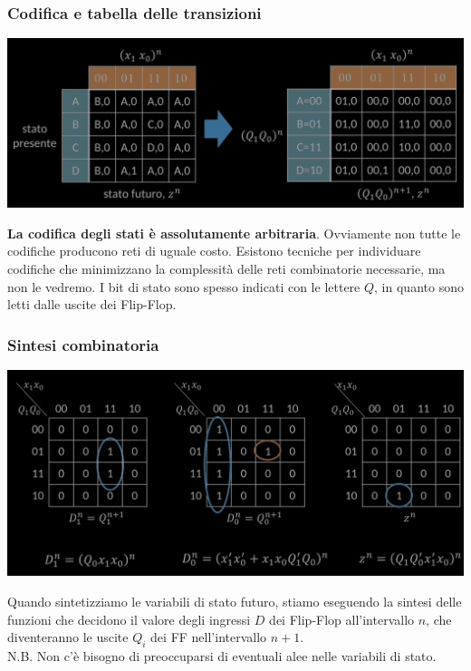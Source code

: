 \documentclass{article}
\begin{document}
\subsubsection*{Codifica e tabella delle transizioni}
\begin{center}
    \includegraphics[scale=0.37]{codifica-cassaforte-rss.png}
\end{center}
\textbf{La codifica degli stati è assolutamente arbitraria}. Ovviamente non tutte le codifiche producono reti di uguale costo. Esistono tecniche per individuare codifiche che minimizzano la complessità delle reti combinatorie necessarie, ma non le vedremo. I bit di stato sono spesso indicati con le lettere $Q$, in quanto sono letti dalle uscite dei Flip-Flop.
\subsubsection*{Sintesi combinatoria}
\begin{center}
    \includegraphics[scale=0.37]{Sintesi-cassaforte-rss.png}
\end{center}
Quando sintetizziamo le variabili di stato futuro, stiamo eseguendo la sintesi delle funzioni che decidono il valore degli ingressi $D$ dei Flip-Flop all’intervallo $n$, che diventeranno le uscite $Q_i$ dei FF nell’intervallo $n+1$.\\
N.B. Non c’è bisogno di preoccuparsi di eventuali alee nelle variabili di stato.
\end{document}
